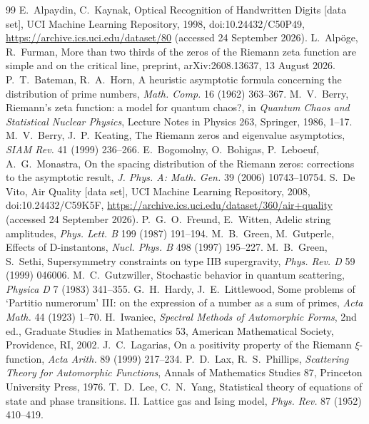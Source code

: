 \documentclass[11pt]{article}
\theoremstyle{definition}\newtheorem{definition}[theorem]{Definition}
\theoremstyle{remark}\newtheorem{remark}[theorem]{Remark}
\begin{document}
\begin{thebibliography}{99}\small
{} E.~Alpaydin, C.~Kaynak, Optical Recognition of Handwritten Digits [data set], UCI Machine Learning Repository, 1998, doi:10.24432/C50P49, \url{https://archive.ics.uci.edu/dataset/80} (accessed 24 September 2026).
 L.~Alp\"oge, R.~Furman, More than two thirds of the zeros of the Riemann zeta function are simple and on the critical line, preprint, arXiv:2608.13637, 13 August 2026.
 P.~T.~Bateman, R.~A.~Horn, A heuristic asymptotic formula concerning the distribution of prime numbers, \emph{Math. Comp.} 16 (1962) 363--367.
 M.~V.~Berry, Riemann's zeta function: a model for quantum chaos?, in \emph{Quantum Chaos and Statistical Nuclear Physics}, Lecture Notes in Physics 263, Springer, 1986, 1--17.
 M.~V.~Berry, J.~P.~Keating, The Riemann zeros and eigenvalue asymptotics, \emph{SIAM Rev.} 41 (1999) 236--266.
 E.~Bogomolny, O.~Bohigas, P.~Leboeuf, A.~G.~Monastra, On the spacing distribution of the Riemann zeros: corrections to the asymptotic result, \emph{J. Phys. A: Math. Gen.} 39 (2006) 10743--10754.
 S.~De Vito, Air Quality [data set], UCI Machine Learning Repository, 2008, doi:10.24432/C59K5F, \url{https://archive.ics.uci.edu/dataset/360/air+quality} (accessed 24 September 2026).
 P.~G.~O.~Freund, E.~Witten, Adelic string amplitudes, \emph{Phys. Lett. B} 199 (1987) 191--194.
 M.~B.~Green, M.~Gutperle, Effects of D-instantons, \emph{Nucl. Phys. B} 498 (1997) 195--227.
 M.~B.~Green, S.~Sethi, Supersymmetry constraints on type IIB supergravity, \emph{Phys. Rev. D} 59 (1999) 046006.
 M.~C.~Gutzwiller, Stochastic behavior in quantum scattering, \emph{Physica D} 7 (1983) 341--355.
 G.~H.~Hardy, J.~E.~Littlewood, Some problems of `Partitio numerorum' III: on the expression of a number as a sum of primes, \emph{Acta Math.} 44 (1923) 1--70.
 H.~Iwaniec, \emph{Spectral Methods of Automorphic Forms}, 2nd ed., Graduate Studies in Mathematics 53, American Mathematical Society, Providence, RI, 2002.
 J.~C.~Lagarias, On a positivity property of the Riemann $\xi$-function, \emph{Acta Arith.} 89 (1999) 217--234.
 P.~D.~Lax, R.~S.~Phillips, \emph{Scattering Theory for Automorphic Functions}, Annals of Mathematics Studies 87, Princeton University Press, 1976.
 T.~D.~Lee, C.~N.~Yang, Statistical theory of equations of state and phase transitions. II. Lattice gas and Ising model, \emph{Phys. Rev.} 87 (1952) 410--419.

\end{thebibliography}
\end{document}
